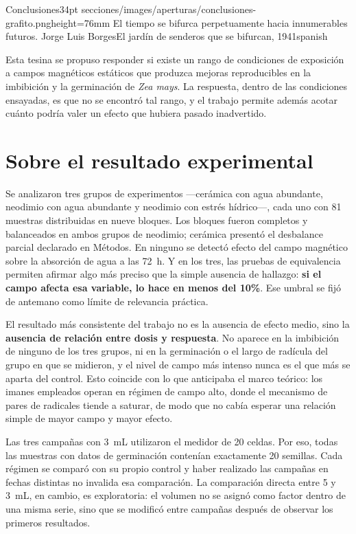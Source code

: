 \aperturacapitulo
  {Conclusiones}{34pt}
  {secciones/images/aperturas/conclusiones-grafito.png}{height=76mm}
  {El tiempo se bifurca perpetuamente hacia innumerables futuros.}
  {Jorge Luis Borges}{El jardín de senderos que se bifurcan, 1941}{spanish}

Esta tesina se propuso responder si existe un rango de condiciones de exposición a campos magnéticos estáticos que produzca mejoras reproducibles en la imbibición y la germinación de \textit{Zea mays}. La respuesta, dentro de las condiciones ensayadas, es que no se encontró tal rango, y el trabajo permite además acotar cuánto podría valer un efecto que hubiera pasado inadvertido.

\section*{Sobre el resultado experimental}

Se analizaron tres grupos de experimentos ---cerámica con agua abundante, neodimio con agua abundante y neodimio con estrés hídrico---, cada uno con 81 muestras distribuidas en nueve bloques. Los bloques fueron completos y balanceados en ambos grupos de neodimio; cerámica presentó el desbalance parcial declarado en Métodos. En ninguno se detectó efecto del campo magnético sobre la absorción de agua a las 72~h. Y en los tres, las pruebas de equivalencia permiten afirmar algo más preciso que la simple ausencia de hallazgo: \textbf{si el campo afecta esa variable, lo hace en menos del 10\%}. Ese umbral se fijó de antemano como límite de relevancia práctica.

El resultado más consistente del trabajo no es la ausencia de efecto medio, sino la \textbf{ausencia de relación entre dosis y respuesta}. No aparece en la imbibición de ninguno de los tres grupos, ni en la germinación o el largo de radícula del grupo en que se midieron, y el nivel de campo más intenso nunca es el que más se aparta del control. Esto coincide con lo que anticipaba el marco teórico: los imanes empleados operan en régimen de campo alto, donde el mecanismo de pares de radicales tiende a saturar, de modo que no cabía esperar una relación simple de mayor campo y mayor efecto.

\begin{alcancelimitacion}
\tituloalcance
Las tres campañas con 3~mL utilizaron el medidor de 20 celdas. Por eso, todas las muestras con datos de germinación contenían exactamente 20 semillas. Cada régimen se comparó con su propio control y haber realizado las campañas en fechas distintas no invalida esa comparación. La comparación directa entre 5 y 3~mL, en cambio, es exploratoria: el volumen no se asignó como factor dentro de una misma serie, sino que se modificó entre campañas después de observar los primeros resultados.
\end{alcancelimitacion}

